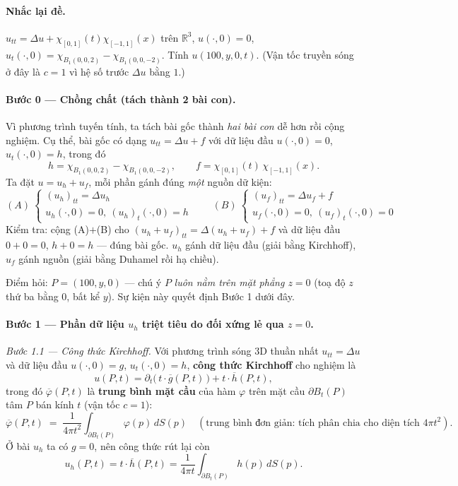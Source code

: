 \paragraph{Nhắc lại đề.}
$u_{tt}=\Delta u+\chi_{[0,1]}(t)\chi_{[-1,1]}(x)$ trên $\mathbb{R}^3$, $u(\cdot,0)=0$,
$u_t(\cdot,0)=\chi_{B_1(0,0,2)}-\chi_{B_1(0,0,-2)}$. Tính $u(100,y,0,t)$. (Vận tốc truyền sóng ở đây là $c=1$ vì hệ số trước $\Delta u$ bằng $1$.)

\paragraph{Bước 0 --- Chồng chất (tách thành 2 bài con).}
Vì phương trình tuyến tính, ta tách bài gốc thành \emph{hai bài con} dễ hơn rồi cộng nghiệm. Cụ thể, bài gốc có dạng $u_{tt}=\Delta u+f$ với dữ liệu đầu $u(\cdot,0)=0$, $u_t(\cdot,0)=h$, trong đó
\[
  h=\chi_{B_1(0,0,2)}-\chi_{B_1(0,0,-2)},\qquad f=\chi_{[0,1]}(t)\,\chi_{[-1,1]}(x).
\]
Ta đặt $u=u_h+u_f$, mỗi phần gánh đúng \emph{một} nguồn dữ kiện:
\[
  (A)\ \begin{cases}(u_h)_{tt}=\Delta u_h\\ u_h(\cdot,0)=0,\ (u_h)_t(\cdot,0)=h\end{cases}
  \qquad
  (B)\ \begin{cases}(u_f)_{tt}=\Delta u_f+f\\ u_f(\cdot,0)=0,\ (u_f)_t(\cdot,0)=0\end{cases}
\]
Kiểm tra: cộng (A)$+$(B) cho $(u_h+u_f)_{tt}=\Delta(u_h+u_f)+f$ và dữ liệu đầu $0+0=0$, $h+0=h$ --- đúng bài gốc. $u_h$ gánh dữ liệu đầu (giải bằng Kirchhoff), $u_f$ gánh nguồn (giải bằng Duhamel rồi hạ chiều).

Điểm hỏi: $P=(100,y,0)$ --- chú ý $P$ \emph{luôn nằm trên mặt phẳng $z=0$} (toạ độ $z$ thứ ba bằng $0$, bất kể $y$). Sự kiện này quyết định Bước 1 dưới đây.

\paragraph{Bước 1 --- Phần dữ liệu $u_h$ triệt tiêu do đối xứng lẻ qua $z=0$.}\leavevmode

\emph{Bước 1.1 --- Công thức Kirchhoff.} Với phương trình sóng 3D thuần nhất $u_{tt}=\Delta u$ và dữ liệu đầu $u(\cdot,0)=g$, $u_t(\cdot,0)=h$, \textbf{công thức Kirchhoff} cho nghiệm là
\[
  u(P,t)=\partial_t\!\Big(\,t\cdot\overline{g}(P,t)\,\Big)+t\cdot\overline{h}(P,t),
\]
trong đó $\overline{\varphi}(P,t)$ là \textbf{trung bình mặt cầu} của hàm $\varphi$ trên mặt cầu $\partial B_t(P)$ tâm $P$ bán kính $t$ (vận tốc $c=1$):
\[
  \overline{\varphi}(P,t)\;=\;\frac{1}{4\pi t^2}\int_{\partial B_t(P)} \varphi(p)\,dS(p)
  \quad(\text{trung bình đơn giản: tích phân chia cho diện tích }4\pi t^2).
\]
Ở bài $u_h$ ta có $g=0$, nên công thức rút lại còn
\[
  u_h(P,t)=t\cdot\overline{h}(P,t)=\frac{1}{4\pi t}\int_{\partial B_t(P)} h(p)\,dS(p).
\]

